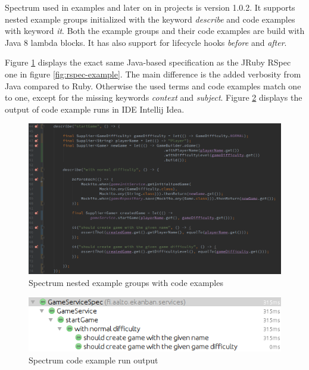     Spectrum used in examples and later on in projects is version 1.0.2. It supports nested example groups initialized
    with the keyword \textit{describe} and code examples with keyword \textit{it}. Both the example groups and their code
    examples are build with Java 8 lambda blocks. It has also support for lifecycle hooks \textit{before} and \textit{after}. ~\cite{spectrum-102}

    Figure \ref{fig:spectrum-example} displays the exact same Java-based specification as the JRuby RSpec one in figure \ref{fig:rspec-example}.
    The main difference is the added verbosity from Java compared to Ruby. Otherwise the used terms and code examples
    match one to one, except for the missing keywords \textit{context} and \textit{subject}. Figure \ref{fig:spectrum-result}
    displays the output of code example runs in IDE Intellij Idea.
    \begin{figure}[ht]
      \begin{center}
        \includegraphics[width=13.7cm]{images/spectrum-example.png}
        \caption{Spectrum nested example groups with code examples}
        \label{fig:spectrum-example}
      \end{center}
    \end{figure}
    \begin{figure}[ht]
      \begin{center}
        \includegraphics[width=13.7cm]{images/spectrum-result.png}
        \caption{Spectrum code example run output}
        \label{fig:spectrum-result}
      \end{center}
    \end{figure}

